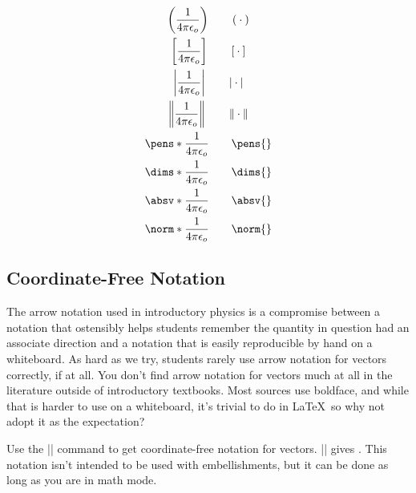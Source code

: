 \documentclass{article}
\begin{document}
\begin{gather*}
\inpens[\frac{1}{4\pi\epsilon_o}] \qquad \inpens \\
\indims[\frac{1}{4\pi\epsilon_o}] \qquad \indims \\
\inabsv[\frac{1}{4\pi\epsilon_o}] \qquad \inabsv \\
\innorm[\frac{1}{4\pi\epsilon_o}] \qquad \innorm \\
\pens*{\frac{1}{4\pi\epsilon_o}}  \qquad \pens{} \\
\dims*{\frac{1}{4\pi\epsilon_o}}  \qquad \dims{} \\
\absv*{\frac{1}{4\pi\epsilon_o}}  \qquad \absv{} \\
\norm*{\frac{1}{4\pi\epsilon_o}}  \qquad \norm{} \\
\end{gather*}

\subsection{Coordinate-Free Notation}
The arrow notation used in introductory physics is a compromise between a notation that ostensibly
helps students remember the quantity in question had an associate direction and a notation that
is easily reproducible by hand on a whiteboard. As hard as we try, students rarely use arrow
notation for vectors correctly, if at all. You don't find arrow notation for vectors much at 
all in the literature outside of introductory textbooks. Most sources use boldface, and while 
that is harder to use on a whiteboard, it's trivial to do in \LaTeX\ so why not adopt it as
the expectation?

Use the || command to get coordinate-free notation for vectors. || 
gives . This notation isn't intended to be used with embellishments, but it can be done 
as long as you are in math mode.
\end{document}
